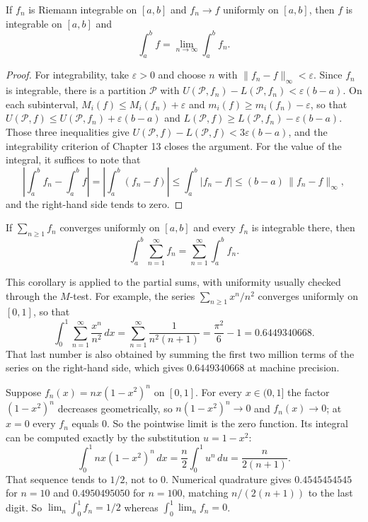 \begin{teorema}
If $f_n$ is Riemann integrable on $[a,b]$ and $f_n\to f$ uniformly on
$[a,b]$, then $f$ is integrable on $[a,b]$ and
\[
  \int_a^b f=\lim_{n\to\infty}\int_a^b f_n .
\]
\end{teorema}

\begin{proof}
For integrability, take $\varepsilon>0$ and choose $n$ with
$\|f_n-f\|_\infty<\varepsilon$. Since $f_n$ is integrable, there is a partition
$\mathcal{P}$ with $U(\mathcal{P},f_n)-L(\mathcal{P},f_n)<\varepsilon(b-a)$.
On each subinterval, $M_i(f)\le M_i(f_n)+\varepsilon$ and
$m_i(f)\ge m_i(f_n)-\varepsilon$, so that
$U(\mathcal{P},f)\le U(\mathcal{P},f_n)+\varepsilon(b-a)$ and
$L(\mathcal{P},f)\ge L(\mathcal{P},f_n)-\varepsilon(b-a)$. Those three inequalities
give $U(\mathcal{P},f)-L(\mathcal{P},f)<3\varepsilon(b-a)$, and the integrability
criterion of Chapter 13 closes the argument. For the value of the integral, it suffices
to note that
\[
  \left|\int_a^b f_n-\int_a^b f\right|
  =\left|\int_a^b (f_n-f)\right|
  \le\int_a^b|f_n-f|\le(b-a)\,\|f_n-f\|_\infty ,
\]
and the right-hand side tends to zero.
\end{proof}

\begin{akibat}
If $\sum_{n\ge1}f_n$ converges uniformly on $[a,b]$ and every $f_n$ is
integrable there, then
\[
  \int_a^b\sum_{n=1}^{\infty}f_n=\sum_{n=1}^{\infty}\int_a^b f_n .
\]
\end{akibat}

This corollary is applied to the partial sums, with uniformity usually
checked through the $M$-test. For example, the series $\sum_{n\ge1}x^n/n^2$ converges uniformly
on $[0,1]$, so that
\[
  \int_0^1\sum_{n=1}^{\infty}\frac{x^n}{n^2}\,dx
  =\sum_{n=1}^{\infty}\frac{1}{n^2(n+1)}=\frac{\pi^2}{6}-1=0.6449340668 .
\]
That last number is also obtained by summing the first two million terms of the series on
the right-hand side, which gives $0.6449340668$ at machine precision.

\begin{contoh}
Suppose $f_n(x)=nx(1-x^2)^n$ on $[0,1]$. For every $x\in(0,1]$ the factor
$(1-x^2)^n$ decreases geometrically, so $n(1-x^2)^n\to0$ and $f_n(x)\to0$;
at $x=0$ every $f_n$ equals $0$. So the pointwise limit is the zero function.
Its integral can be computed exactly by the substitution $u=1-x^2$:
\[
  \int_0^1 nx(1-x^2)^n\,dx=\frac{n}{2}\int_0^1 u^n\,du=\frac{n}{2(n+1)} .
\]
That sequence tends to $1/2$, not to $0$. Numerical quadrature gives
$0.4545454545$ for $n=10$ and $0.4950495050$ for $n=100$, matching
$n/(2(n+1))$ to the last digit. So $\lim_n\int_0^1f_n=1/2$ whereas
$\int_0^1\lim_nf_n=0$.
\end{contoh}

